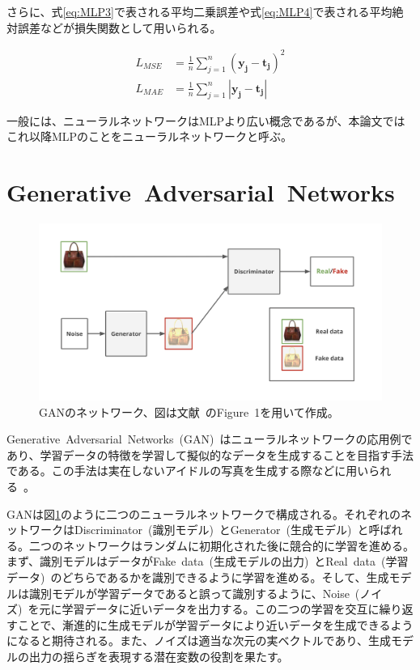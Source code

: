 さらに、式\ref{eq:MLP3}で表される平均二乗誤差や式\ref{eq:MLP4}で表される平均絶対誤差などが損失関数として用いられる。

\begin{align}
    \label{eq:MLP3}
    L_{MSE}&=\frac{1}{n}\sum _{j=1} ^{n} {(\boldsymbol{y_j} - \boldsymbol{t_j})^2}\\
    \label{eq:MLP4}
    L_{MAE}&=\frac{1}{n}\sum _{j=1} ^{n} {|\boldsymbol{y_j} - \boldsymbol{t_j}|}
\end{align}

一般には、ニューラルネットワークはMLPより広い概念であるが、本論文ではこれ以降MLPのことをニューラルネットワークと呼ぶ。

\section{Generative~Adversarial~Networks}

\begin{figure}[t]
\begin{center}
\includegraphics[width=\hsize]{figure/GAN_net.png}
\caption{GANのネットワーク、図は文献~\cite{pix2pix}のFigure~1を用いて作成。}
\label{fig:GAN_net}
\end{center}
\end{figure}

Generative~Adversarial~Networks~(GAN)~\cite{GAN}はニューラルネットワークの応用例であり、学習データの特徴を学習して擬似的なデータを生成することを目指す手法である。この手法は実在しないアイドルの写真を生成する際などに用いられる~\cite{idol}。

GANは図\ref{fig:GAN_net}のように二つのニューラルネットワークで構成される。それぞれのネットワークはDiscriminator~(識別モデル)~とGenerator~(生成モデル)~と呼ばれる。二つのネットワークはランダムに初期化された後に競合的に学習を進める。まず、識別モデルはデータがFake~data~(生成モデルの出力)~とReal~data~(学習データ)~のどちらであるかを識別できるように学習を進める。そして、生成モデルは識別モデルが学習データであると誤って識別するように、Noise~(ノイズ)~を元に学習データに近いデータを出力する。この二つの学習を交互に繰り返すことで、漸進的に生成モデルが学習データにより近いデータを生成できるようになると期待される。また、ノイズは適当な次元の実ベクトルであり、生成モデルの出力の揺らぎを表現する潜在変数の役割を果たす。

